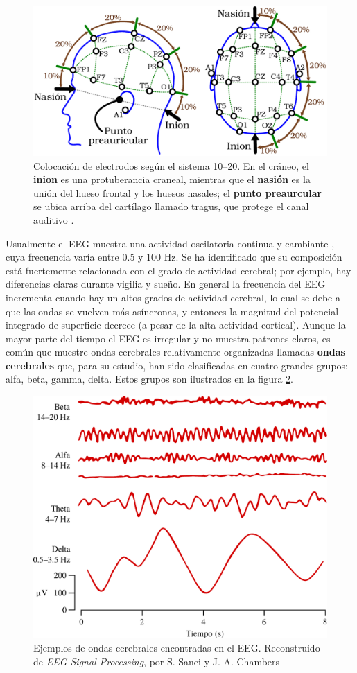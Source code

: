 \documentclass[12pt,a4paper]{mitthesis}
\begin{document}
\begin{figure}
\centering
\includegraphics[width=0.9\linewidth]{cabeza_hecha.pdf} 
\caption{Colocaci\'on de electrodos seg\'un el sistema 10--20. En el cr\'aneo, el \textbf{inion} es 
una protuberancia craneal, mientras que el \textbf{nasi\'on} es la uni\'on del hueso frontal y los 
huesos nasales; el \textbf{punto preaurcular} se ubica arriba del cart\'ilago llamado tragus, que 
protege el canal auditivo \cite{Butkov07}. 
}
\label{img1020}
\end{figure}

Usualmente el EEG muestra una actividad oscilatoria continua y cambiante \cite{Clark98}, cuya 
frecuencia var\'ia entre 0.5 y 100 Hz.
Se ha identificado que su composici\'on est\'a fuertemente relacionada con el grado de actividad 
cerebral; por ejemplo, hay diferencias claras durante vigilia y sue\~no.
En general la frecuencia del EEG incrementa cuando hay un altos grados de actividad cerebral, lo 
cual se debe a que las ondas se vuelven m\'as as\'incronas, y entonces la magnitud del  potencial 
integrado de superficie decrece (a pesar de la alta actividad cortical).
Aunque la mayor parte del tiempo el EEG es irregular y no muestra patrones claros, es com\'un que 
muestre ondas cerebrales relativamente organizadas llamadas \textbf{ondas cerebrales} que, 
para su estudio, han sido clasificadas en 
cuatro grandes grupos: alfa, beta, gamma, delta.
Estos grupos son ilustrados en la figura \ref{ritmos}.

\begin{figure}
\centering
\includegraphics[width=0.55\linewidth]{ritmos_hechos.pdf} 
\caption{Ejemplos de ondas cerebrales encontradas en el EEG. Reconstruido de 
\textit{EEG Signal Processing}, por S. Sanei y J. A. Chambers \cite{Sanei07} 
}
\label{ritmos}
\end{figure}
\end{document}
